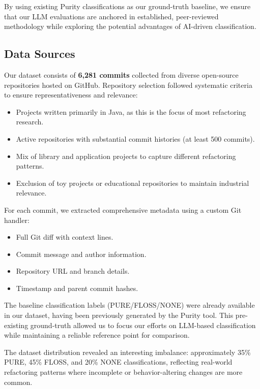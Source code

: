 By using existing Purity classifications as our ground-truth baseline, we ensure that our LLM evaluations are anchored in established, peer-reviewed methodology while exploring the potential advantages of AI-driven classification.

\subsection{Data Sources}

Our dataset consists of \textbf{6,281 commits} collected from diverse open-source repositories hosted on GitHub. Repository selection followed systematic criteria to ensure representativeness and relevance:
\begin{itemize}
    \item Projects written primarily in Java, as this is the focus of most refactoring research.
    \item Active repositories with substantial commit histories (at least 500 commits).
    \item Mix of library and application projects to capture different refactoring patterns.
    \item Exclusion of toy projects or educational repositories to maintain industrial relevance.
\end{itemize}

For each commit, we extracted comprehensive metadata using a custom Git handler:
\begin{itemize}
    \item Full Git diff with context lines.
    \item Commit message and author information.
    \item Repository URL and branch details.
    \item Timestamp and parent commit hashes.
\end{itemize}

The baseline classification labels (PURE/FLOSS/NONE) were already available in our dataset, having been previously generated by the Purity tool. This pre-existing ground-truth allowed us to focus our efforts on LLM-based classification while maintaining a reliable reference point for comparison.

The dataset distribution revealed an interesting imbalance: approximately 35\% PURE, 45\% FLOSS, and 20\% NONE classifications, reflecting real-world refactoring patterns where incomplete or behavior-altering changes are more common.

